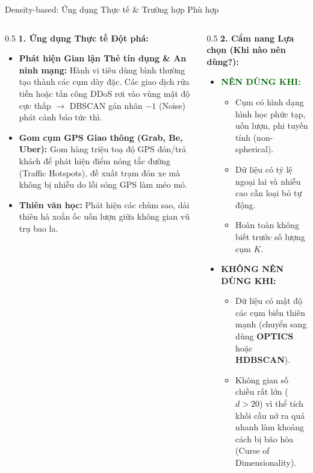 \documentclass[aspectratio=169,10pt]{beamer}
\begin{document}
\begin{frame}{Density-based: Ứng dụng Thực tế \& Trường hợp Phù hợp}
  \footnotesize
  \begin{columns}[T]
    \begin{column}{0.5\textwidth}
      \textbf{1. Ứng dụng Thực tế Đột phá:}
      \begin{itemize}\setlength{\itemsep}{2pt}
        \item \textbf{Phát hiện Gian lận Thẻ tín dụng \& An ninh mạng:}
          Hành vi tiêu dùng bình thường tạo thành các cụm dày đặc. Các giao dịch rửa tiền hoặc tấn công DDoS rơi vào vùng mật độ cực thấp $\to$ DBSCAN gán nhãn $-1$ (Noise) phát cảnh báo tức thì.
        \item \textbf{Gom cụm GPS Giao thông (Grab, Be, Uber):}
          Gom hàng triệu toạ độ GPS đón/trả khách để phát hiện điểm nóng tắc đường (Traffic Hotspots), đề xuất trạm đón xe mà không bị nhiễu do lỗi sóng GPS làm méo mó.
        \item \textbf{Thiên văn học:} Phát hiện các chùm sao, dải thiên hà xoắn ốc uốn lượn giữa không gian vũ trụ bao la.
      \end{itemize}
    \end{column}
    \begin{column}{0.5\textwidth}
      \textbf{2. Cẩm nang Lựa chọn (Khi nào nên dùng?):}
      \begin{itemize}\setlength{\itemsep}{2pt}
        \item \textcolor{darkgreen}{\textbf{NÊN DÙNG KHI:}}
          \begin{itemize}
            \item Cụm có hình dạng hình học phức tạp, uốn lượn, phi tuyến tính (non-spherical).
            \item Dữ liệu có tỷ lệ ngoại lai và nhiễu cao cần loại bỏ tự động.
            \item Hoàn toàn không biết trước số lượng cụm $K$.
          \end{itemize}
        \item \textcolor{crimsonred}{\textbf{KHÔNG NÊN DÙNG KHI:}}
          \begin{itemize}
            \item Dữ liệu có mật độ các cụm biến thiên mạnh (chuyển sang dùng \textbf{OPTICS} hoặc \textbf{HDBSCAN}).
            \item Không gian số chiều rất lớn ($d > 20$) vì thể tích khối cầu nở ra quá nhanh làm khoảng cách bị bão hòa (Curse of Dimensionality).
          \end{itemize}
      \end{itemize}
    \end{column}
  \end{columns}
\end{frame}
\end{document}

